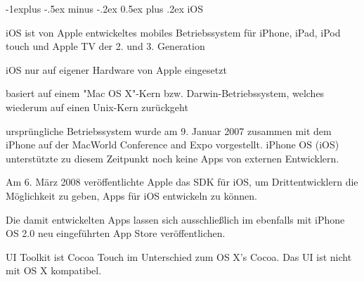 \documentclass[a4paper, 8pt]{article}
\makeatletter
\renewcommand{\subsection}{\@startsection{subsection}{2}{0mm}%
                                {-1explus -.5ex minus -.2ex}%
                                {0.5ex plus .2ex}%
                                {\normalfont\normalsize\bfseries}}
\makeatother
\begin{document}
\begin{multicols*}{2}
  \subsection{iOS}
  \begin{itemize*}
    \item iOS ist von Apple entwickeltes mobiles Betriebssystem für iPhone, iPad, iPod touch und Apple TV der 2. und 3. Generation
    \item iOS nur auf eigener Hardware von Apple eingesetzt
    \item basiert auf einem "Mac OS X"-Kern bzw. Darwin-Betriebssystem, welches wiederum auf einen Unix-Kern zurückgeht
    \item ursprüngliche Betriebssystem wurde am 9. Januar 2007 zusammen mit dem iPhone auf der MacWorld Conference and Expo vorgestellt. iPhone OS (iOS) unterstützte zu diesem Zeitpunkt noch keine Apps von externen Entwicklern.
    \item Am 6. März 2008 veröffentlichte Apple das SDK für iOS, um Drittentwicklern die Möglichkeit zu geben, Apps für iOS entwickeln zu können.
    \item Die damit entwickelten Apps lassen sich ausschließlich im ebenfalls mit iPhone OS 2.0 neu eingeführten App Store veröffentlichen.
    \item UI Toolkit ist Cocoa Touch im Unterschied zum OS X's Cocoa. Das UI ist nicht mit OS X kompatibel.
  \end{itemize*}


\end{multicols*}
\end{document}

